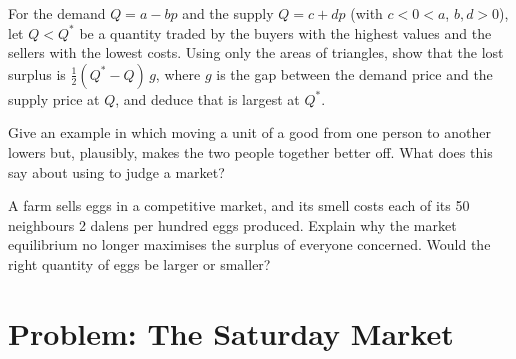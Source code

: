 \begin{exercise}[$\star\star\star$]\label{exo:g10:surplus-and-efficiency:13}
For the demand $Q = a - bp$ and the supply $Q = c + dp$ (with $c < 0 < a$, $b, d > 0$), let $Q < Q^*$ be a quantity traded by the buyers with the highest values
and the sellers with the lowest costs. Using only the areas of triangles, show that the lost surplus is $\tfrac12 (Q^* - Q)\,g$, where $g$ is the gap
between the demand price and the supply price at $Q$, and deduce that  is largest at $Q^*$.
\end{exercise}

\begin{exercise}[$\star\star\star$]\label{exo:g10:surplus-and-efficiency:14}
Give an example in which moving a unit of a good from one person to another lowers  but, plausibly, makes the two people together better off.
What does this say about using  to judge a market?
\end{exercise}

\begin{exercise}[$\star\star\star$]\label{exo:g10:surplus-and-efficiency:15}
A farm sells eggs in a competitive market, and its smell costs each of its 50 neighbours 2 dalens per hundred eggs produced. Explain why the market
equilibrium no longer maximises the surplus of everyone concerned. Would the right quantity of eggs be larger or smaller?
\end{exercise}

\section{Problem: The Saturday Market}

